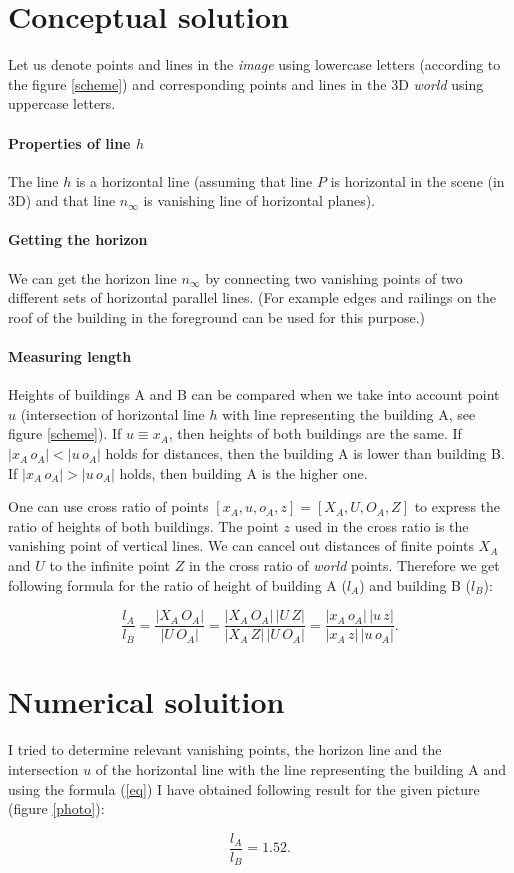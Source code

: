 \documentclass[11pt,oneside,a4paper,pdftex]{article}   %
\begin{document}
\section{Conceptual solution}

Let us denote points and lines in the \emph{image} using lowercase letters (according to the figure \ref{scheme})
and corresponding points and lines in the 3D \emph{world} using uppercase letters.

\paragraph{Properties of line $h$} The line $h$ is a horizontal line (assuming that line
$P$ is horizontal in the scene (in 3D) and that line $n_\infty$ is vanishing line of horizontal planes).

\paragraph{Getting the horizon} We can get the horizon line $n_\infty$ by connecting two vanishing points
of two different sets of horizontal parallel lines. (For example edges and railings on the roof of the building
in the foreground can be used for this purpose.)

\paragraph{Measuring length} Heights of buildings A and B can be compared when we take into account
point $u$ (intersection of horizontal line $h$ with line representing the building A, see figure \ref{scheme}).
If $u \equiv x_A$, then heights of both buildings are the same. If $|x_A\,o_A| < |u\,o_A|$ holds for distances, then
the building A is lower than building B. If $|x_A\,o_A| > |u\,o_A|$ holds, then building A is the higher one.

One can use cross ratio of points $[x_A, u, o_A, z] = [X_A, U, O_A, Z]$ to express the ratio of heights of both buildings.
The point $z$ used in the cross ratio is the vanishing point of vertical lines. We can cancel out distances
of finite points $X_A$ and $U$ to the infinite point $Z$ in the cross ratio of \emph{world} points. Therefore
we get following formula for the ratio of height of building A ($l_A$) and building B ($l_B$):

\begin{equation}
	\label{eq}
	\frac{l_A}{l_B} = \frac{|X_A\,O_A|}{|U\,O_A|} = \frac{|X_A\,O_A|\,|U\,Z|}{|X_A\,Z|\,|U\,O_A|} = \frac{|x_A\,o_A|\,|u\,z|}{|x_A\,z|\,|u\,o_A|}.
\end{equation}

\section{Numerical soluition}

I tried to determine relevant vanishing points, the horizon line and the intersection $u$ of the horizontal line
with the line representing the building A and using the formula (\ref{eq}) I have obtained following result for
the given picture (figure \ref{photo}):

		$$ \frac{l_A}{l_B} = 1.52. $$
	
\end{document}
